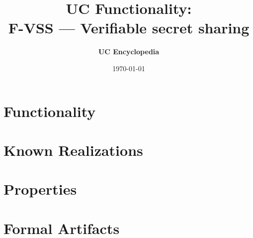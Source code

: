 \documentclass[11pt,a4paper]{article}
\title{\textbf{\Large UC Functionality:}\\[0.2em] \Large F-VSS --- Verifiable secret sharing}
\author{\textbf{UC Encyclopedia}}
\date{\today}
\newtheorem{functionality}{Functionality}
\begin{document}
\maketitle

\begin{abstract}
\end{abstract}

\section{Functionality}

%

\section{Known Realizations}


\section{Properties}


\section{Formal Artifacts}

\end{document}
